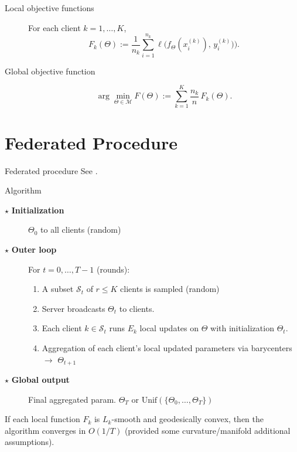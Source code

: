 \documentclass[aspectratio=169,xcolor=dvipsnames]{beamer}
\begin{document}
\begin{frame}
\begin{description}
    \item[Local objective functions] For each client $k=1,\dots, K$,
    $$F_k(\Theta):=\frac{1}{n_k}\sum_{i=1}^{n_k}\ell\bigl(f_{\Theta}(x_i^{(k)}),\,y_i^{(k)})\bigr).$$
    \item[Global objective function]
    $$\arg \min_{\Theta \in \mathcal{M}}F(\Theta):=\sum_{k=1}^{K}\frac{n_k}{n}\,F_k(\Theta).$$
\end{description}
\end{frame}

\section{Federated Procedure}

\begin{frame}{Federated procedure}
See \cite{li2022federated}.
\begin{block}{Algorithm}
\begin{description}
    \item[$\star$ \textbf{Initialization}] $\Theta_{0}$ to all clients (random)
    \item[$\star$ \textbf{Outer loop}] For $t=0,\dots, T-1$ (rounds):
    \begin{enumerate}
        \item A subset $\mathcal{S}_t$ of $r\leq K$ clients is sampled (random)
        \item Server broadcasts $\Theta_{t}$ to clients.
        \item Each client $k\in \mathcal{S}_t$ runs $E_k$ local updates on $\Theta$ with initialization $\Theta_{t}$.
        \item Aggregation of each client's local updated parameters via barycenters $\to$ $\Theta_{t+1}$
    \end{enumerate}
    \item[$\star$ \textbf{Global output}] Final aggregated param. $\Theta_{T}$ or $\text{Unif}(\{\Theta_{0},\dots,\Theta_{T}\})$
\end{description}
\end{block}
\vspace{0.5cm}
If each local function $F_k$ is $L_k$-smooth and geodesically convex, then the algorithm converges in $O(1/T)$ (provided some curvature/manifold additional assumptions).
\end{frame}
\end{document}
